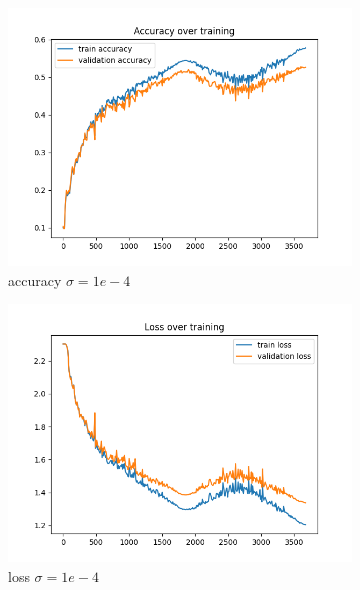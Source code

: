 \documentclass[a4paper]{article}
\begin{document}
\begin{figure}[h]
	\begin{subfigure}{0.3\textwidth}
		\centering
		\includegraphics[width=\linewidth]{images/sens_sigma_0.0001_use_bn_True_acc.png}
		\caption{accuracy $\sigma=1e-4$}
	\end{subfigure}
	\begin{subfigure}{0.3\textwidth}
		\centering
		\includegraphics[width=\linewidth]{images/sens_sigma_0.0001_use_bn_True_loss.png}
		\caption{loss $\sigma=1e-4$}
	\end{subfigure}
	\begin{subfigure}{0.3\textwidth}
		\centering

\end{subfigure}
\end{figure}
\end{document}
